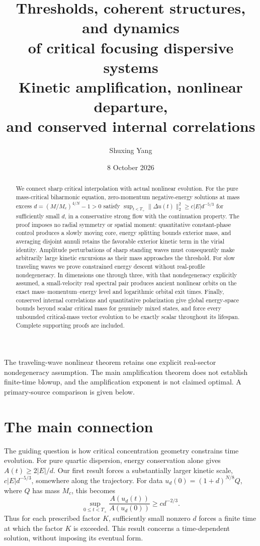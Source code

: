 \documentclass[11pt,a4paper]{article}
\title{Thresholds, coherent structures, and dynamics\\of critical focusing dispersive systems\\[5pt]
\large Kinetic amplification, nonlinear departure,\\and conserved internal correlations}
\author{Shuxing Yang}
\date{8 October 2026}
\theoremstyle{remark}\newtheorem{remark}[theorem]{Remark}
\begin{document}
\maketitle
\begin{abstract}
We connect sharp critical interpolation with actual nonlinear evolution.
For the pure mass-critical biharmonic equation, zero-momentum
negative-energy solutions at mass excess
$d=(M/M_c)^{4/N}-1>0$ satisfy
$\sup_{t<T_+}\|\Delta u(t)\|_2^2\ge c|E|d^{-5/3}$ for sufficiently
small $d$, in a conservative strong flow with the continuation property.
The proof imposes no radial symmetry or spatial moment: quantitative
constant-phase control produces a slowly moving core, energy splitting
bounds exterior mass, and averaging disjoint annuli retains the favorable
exterior kinetic term in the virial identity. Amplitude perturbations of
sharp standing waves must consequently make arbitrarily large kinetic
excursions as their mass approaches the threshold.
For slow traveling waves we prove constrained energy descent without
real-profile nondegeneracy. In dimensions one through three, with that
nondegeneracy explicitly assumed, a small-velocity real spectral pair
produces ancient nonlinear orbits on the exact mass--momentum--energy
level and logarithmic orbital exit times. Finally, conserved internal
correlations and quantitative polarization give global energy-space
bounds beyond scalar critical mass for genuinely mixed states, and
force every unbounded critical-mass vector evolution to be exactly
scalar throughout its lifespan. Complete supporting proofs are included.
\end{abstract}

The traveling-wave nonlinear theorem retains one explicit real-sector
nondegeneracy assumption. The main amplification theorem does not
establish finite-time blowup, and the amplification exponent is not
claimed optimal. A primary-source comparison is given below.

\section*{The main connection}
The guiding question is how critical concentration geometry constrains
time evolution. For pure quartic dispersion, energy conservation alone
gives $A(t)\ge2|E|/d$. Our first result forces a substantially larger
kinetic scale, $c|E|d^{-5/3}$, somewhere along the trajectory. For data
$u_d(0)=(1+d)^{N/8}Q$, where $Q$ has mass $M_c$, this becomes
\[
 \sup_{0\le t<T_+}\frac{A(u_d(t))}{A(u_d(0))}\ge c d^{-2/3}.
\]
Thus for each prescribed factor $K$, sufficiently small nonzero $d$
forces a finite time at which the factor $K$ is exceeded. This result
concerns a time-dependent solution, without imposing its eventual form.
\end{document}

